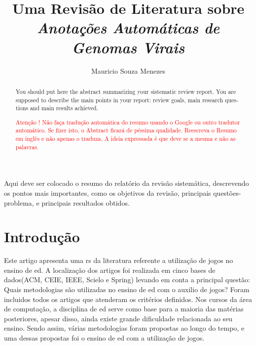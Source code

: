 \documentclass[12pt]{article}
\title{Uma Revisão de Literatura sobre \textit{Anotações Automáticas de Genomas Virais}}
\author{Mauricio Souza Menezes\\}
\begin{document}

\maketitle

\begin{resumo}
    Aqui deve ser colocado o resumo do relatório da revisão sistemática, descrevendo os pontos mais importantes, como os objetivos da revisão, principais questões-problema, e principais resultados obtidos.
\end{resumo}


\begin{abstract}
    \begin{otherlanguage}{english}
        You should put here the abstract summarizing your sistematic review report. You are supposed to describe the main points in your report: review goals, main research questions and main results achieved.
    \end{otherlanguage} \textcolor{red}{Atenção ! Não faça tradução automática do resumo usando o Google ou outro tradutor automático. Se fizer isto, o Abstract ficará de péssima qualidade. Reescreva o Resumo em inglês e não apenas o traduza. A ideia expressada é que deve se a mesma e não as palavras.}
\end{abstract}


\section{Introdução}

Este artigo apresenta uma \gls{rs} da literatura referente a utilização de jogos no ensino de \gls{ed}. A localização dos artigos foi realizada em cinco bases de dados(ACM, CEIE, IEEE, Scielo e Spring) levando em conta a principal questão: Quais metodologias são utilizadas no ensino de \gls{ed} com o auxilio de jogos? Foram incluidos todos os artigos que atenderam os critérios definidos.
Nos cursos da área de computação, a disciplina de \gls{ed} serve como base para a maioria das matérias posteriores, apesar disso, ainda existe grande dificuldade relacionada ao seu ensino. Sendo assim, várias metodologias foram propostas ao longo do tempo, e uma dessas propostas foi o ensino de \gls{ed} com a utilização de jogos.
\end{document}
